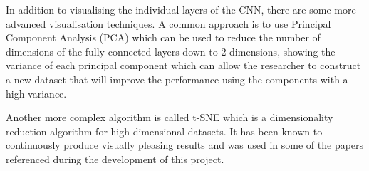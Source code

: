 In addition to visualising the individual layers of the CNN, there are some more advanced visualisation techniques. A common approach is to use Principal Component Analysis (PCA) which can be used to reduce the number of dimensions of the fully-connected layers down to 2 dimensions, showing the variance of each principal component which can allow the researcher to construct a new dataset that will improve the performance using the components with a high variance.

Another more complex algorithm is called t-SNE  \cite{vanDerMaaten2008} which is a dimensionality reduction algorithm for high-dimensional datasets. It has been known to continuously produce visually pleasing results and was used in some of the papers referenced during the development of this project.
